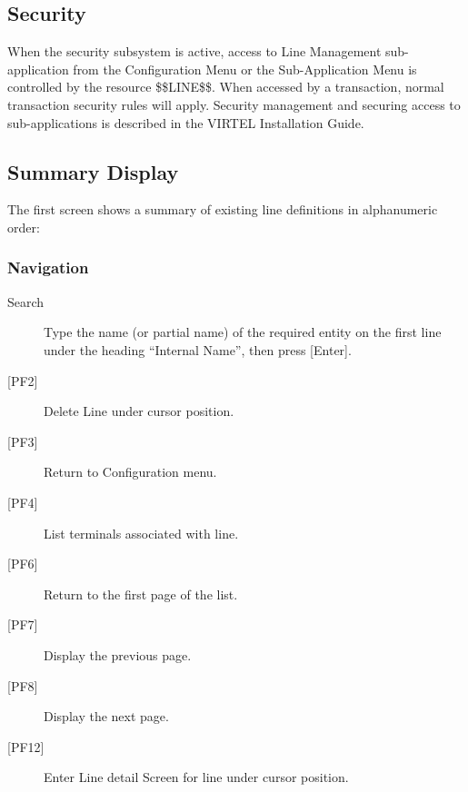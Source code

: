 \documentclass[letterpaper,10pt,english]{sphinxmanual}
\begin{document}
\subsection{Security}
\label{\detokenize{connectivity_guide:security}}
When the security subsystem is active, access to Line Management sub-application from the Configuration Menu or the Sub-Application Menu is controlled by the resource \$\$LINE\$\$.
When accessed by a transaction, normal transaction security rules will apply. Security management and securing access to sub-applications is described in the VIRTEL Installation Guide.

\ignorespaces 

\subsection{Summary Display}
\label{\detokenize{connectivity_guide:summary-display}}\label{\detokenize{connectivity_guide:index-6}}
The first screen shows a summary of existing line definitions in alphanumeric order:



\subsubsection{Navigation}
\label{\detokenize{connectivity_guide:navigation}}\begin{description}
\item[{Search}] \leavevmode
Type the name (or partial name) of the required entity on the first line under the heading “Internal Name”, then press {[}Enter{]}.

\item[{{[}PF2{]}}] \leavevmode
Delete Line under cursor position.

\item[{{[}PF3{]}}] \leavevmode
Return to Configuration menu.

\item[{{[}PF4{]}}] \leavevmode
List terminals associated with line.

\item[{{[}PF6{]}}] \leavevmode
Return to the first page of the list.

\item[{{[}PF7{]}}] \leavevmode
Display the previous page.

\item[{{[}PF8{]}}] \leavevmode
Display the next page.

\item[{{[}PF12{]}}] \leavevmode
Enter Line detail Screen for line under cursor position.

\end{description}
\end{document}
